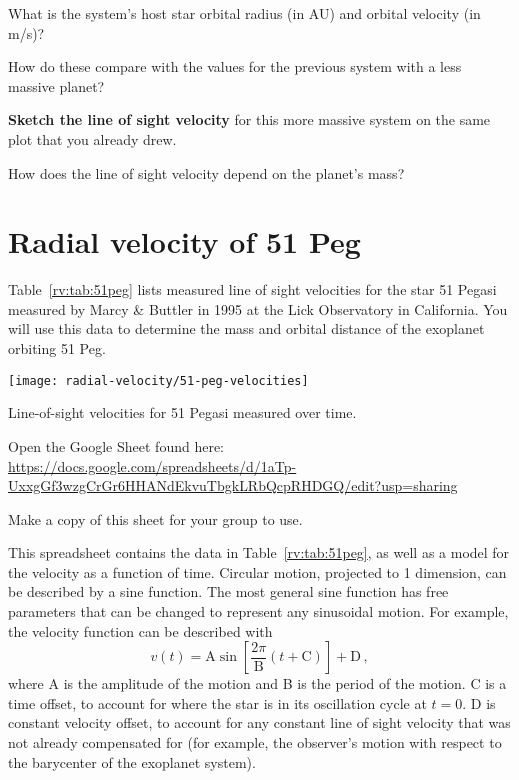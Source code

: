 \begin{steps}
	\item What is the system's host star orbital radius (in AU) and orbital velocity (in m/s)?
	
	\item How do these compare with the values for the previous system with a less massive planet?

	\item \textbf{Sketch the line of sight velocity} for this more massive system on the same plot that you already drew.

	\item How does the line of sight velocity depend on the planet’s mass?
\end{steps}

\section{Radial velocity of 51 Peg}

Table~\ref{rv:tab:51peg} lists measured line of sight velocities for the star 51 Pegasi measured by Marcy \& Buttler in 1995 at the Lick Observatory in California. You will use this data to determine the mass and orbital distance of the exoplanet orbiting 51 Peg.

\begin{table}
	\centering
	\texttt{[image: radial-velocity/51-peg-velocities]}
	\caption{Line-of-sight velocities for 51 Pegasi measured over time.}\label{rv:tab:51peg}
\end{table}

\begin{steps}
	\item Open the Google Sheet found here: \url{https://docs.google.com/spreadsheets/d/1aTp-UxxgGf3wzgCrGr6HHANdEkvuTbgkLRbQcpRHDGQ/edit?usp=sharing}
	
	\item Make a copy of this sheet for your group to use.
\end{steps}

This spreadsheet contains the data in Table~\ref{rv:tab:51peg}, as well as a model for the velocity as a function of time. Circular motion, projected to 1 dimension, can be described by a sine function. The most general sine function has free parameters that can be changed to represent any sinusoidal motion. For example, the velocity function can be described with
\begin{equation}
 v(t) = \textrm{A} \sin \left[\frac{2 \pi}{\textrm{B}}\left(t + \textrm{C}\right)\right] + \textrm{D} \,,
\end{equation}
where A is the amplitude of the motion and B is the period of the motion. C is a time offset, to account for where the star is in its oscillation cycle at $t=0$. D is constant velocity offset, to account for any constant line of sight velocity that was not already compensated for (for example, the observer's motion with respect to the barycenter of the exoplanet system).

